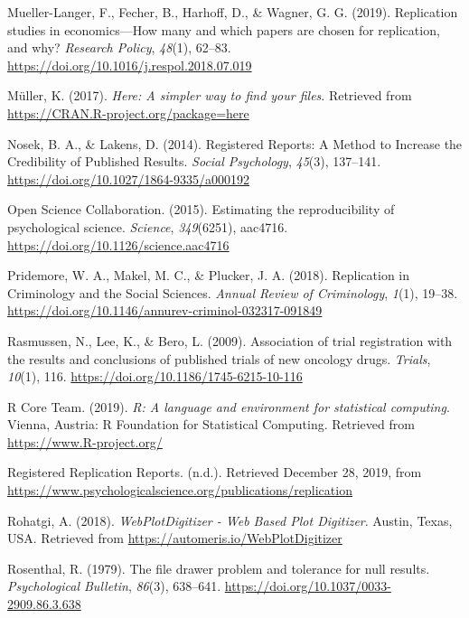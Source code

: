 \documentclass[british,,jou,floatsintext]{apa6}
\begin{document}
\leavevmode\hypertarget{ref-Mueller-Langer2019}{}%
Mueller-Langer, F., Fecher, B., Harhoff, D., \& Wagner, G. G. (2019). Replication studies in economics---How many and which papers are chosen for replication, and why? \emph{Research Policy}, \emph{48}(1), 62--83. \url{https://doi.org/10.1016/j.respol.2018.07.019}

\leavevmode\hypertarget{ref-R-here}{}%
Müller, K. (2017). \emph{Here: A simpler way to find your files}. Retrieved from \url{https://CRAN.R-project.org/package=here}

\leavevmode\hypertarget{ref-Nosek2014}{}%
Nosek, B. A., \& Lakens, D. (2014). Registered Reports: A Method to Increase the Credibility of Published Results. \emph{Social Psychology}, \emph{45}(3), 137--141. \url{https://doi.org/10.1027/1864-9335/a000192}

\leavevmode\hypertarget{ref-OSC2015}{}%
Open Science Collaboration. (2015). Estimating the reproducibility of psychological science. \emph{Science}, \emph{349}(6251), aac4716. \url{https://doi.org/10.1126/science.aac4716}

\leavevmode\hypertarget{ref-Pridemore2018}{}%
Pridemore, W. A., Makel, M. C., \& Plucker, J. A. (2018). Replication in Criminology and the Social Sciences. \emph{Annual Review of Criminology}, \emph{1}(1), 19--38. \url{https://doi.org/10.1146/annurev-criminol-032317-091849}

\leavevmode\hypertarget{ref-Rasmussen2009}{}%
Rasmussen, N., Lee, K., \& Bero, L. (2009). Association of trial registration with the results and conclusions of published trials of new oncology drugs. \emph{Trials}, \emph{10}(1), 116. \url{https://doi.org/10.1186/1745-6215-10-116}

\leavevmode\hypertarget{ref-R-base}{}%
R Core Team. (2019). \emph{R: A language and environment for statistical computing}. Vienna, Austria: R Foundation for Statistical Computing. Retrieved from \url{https://www.R-project.org/}

\leavevmode\hypertarget{ref-RRRwebsite}{}%
Registered Replication Reports. (n.d.). Retrieved December 28, 2019, from \url{https://www.psychologicalscience.org/publications/replication}

\leavevmode\hypertarget{ref-Rohatgi2018}{}%
Rohatgi, A. (2018). \emph{WebPlotDigitizer - Web Based Plot Digitizer}. Austin, Texas, USA. Retrieved from \url{https://automeris.io/WebPlotDigitizer}

\leavevmode\hypertarget{ref-Rosenthal1979}{}%
Rosenthal, R. (1979). The file drawer problem and tolerance for null results. \emph{Psychological Bulletin}, \emph{86}(3), 638--641. \url{https://doi.org/10.1037/0033-2909.86.3.638}
\end{document}
